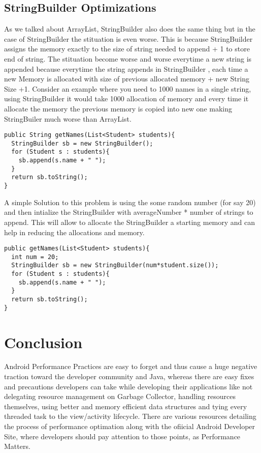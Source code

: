 \documentclass[journal]{IEEEtran}
\begin{document}
\subsection{StringBuilder Optimizations}
As we talked about ArrayList, StringBuilder also does the same thing but in the case of StringBuilder the stituation is even worse. This is because StringBuilder assigns the memory exactly to the size of string needed to append + 1 to store end of string. The stituation become worse and worse everytime a new string is appended because everytime the string appends in StringBuilder , each time a new Memory is allocated with size of previous allocated memory + new String Size +1. Consider an example where you need to 1000 names in a single string, using StringBuilder it would take 1000 allocation of memory and every time it allocate the memory the previous memory is copied into new one making StringBuiler much worse than ArrayList.
\begin{verbatim}
public String getNames(List<Student> students){
  StringBuilder sb = new StringBuilder();
  for (Student s : students){
    sb.append(s.name + " ");
  }
  return sb.toString();
}
\end{verbatim}
A simple Solution to this problem is using the some random number (for say 20) and then intialize the StringBuilder with averageNumber * number of strings to append. This will allow to allocate the StringBuilder a starting memory and can help in reducing the allocations and memory.
\begin{verbatim}
public getNames(List<Student> students){
  int num = 20;
  StringBuilder sb = new StringBuilder(num*student.size());
  for (Student s : students){
    sb.append(s.name + " ");
  }
  return sb.toString();
}
\end{verbatim}

\section{Conclusion}
Android Performance Practices are easy to forget and thus cause a huge negative traction toward the developer community and Java, whereas there are easy fixes and precautions developers can take while developing their applications like not delegating resource management on Garbage Collector, handling resources themselves, using better and memory efficient data structures and tying every threaded task to the view/activity lifecycle. There are various resources detailing the process of performance optimation along with the ofiicial Android Developer Site, where developers should pay attention to those points, as Performance Matters.
\end{document}
